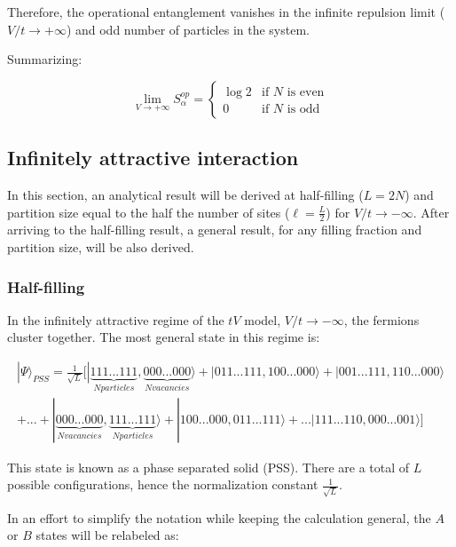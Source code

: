 \begin{samepage}
Therefore, the operational entanglement vanishes in the infinite repulsion limit ($V/t \to + \infty$) and odd number of particles in the system.

Summarizing:

\begin{equation}
\lim_{V \to + \infty} S_{\alpha}^{op} =
\begin{cases}
\log{2}  & \text{if }N\text{ is even} \\
0 & \text{if }N\text{ is odd}
\end{cases}
\end{equation}

\end{samepage}

	\subsection{Infinitely attractive interaction}
	In this section, an analytical result will be derived at half-filling ($L = 2N$) and partition size equal to the half the number of sites ($\ell = \frac{L}{2}$) for $V/t \to - \infty$. After arriving to the half-filling result, a general result, for any filling fraction and partition size, will be also derived. 
	
	\subsubsection{Half-filling}
	In the infinitely attractive regime of the $tV$ model, $V/t \to -\infty$, the fermions cluster together. The most general state in this regime is:
	
\begin{equation}
\begin{aligned}	
| \Psi \rangle_{PSS} = \frac{1}{\sqrt{L}} [ | \underbrace{111...111}_{N particles} , \underbrace{000...000}_{N vacancies} \rangle + |011...111, 100...000 \rangle + |001...111, 110...000 \rangle  \\
+ ...  + |\underbrace{000...000}_{N vacancies}, \underbrace{111...111}_{N particles} \rangle + |100...000, 011...111 \rangle + ... |111...110, 000...001 \rangle ]
\end{aligned}
\end{equation}

This state is known as a phase separated solid (PSS). There are a total of $L$ possible configurations, hence the normalization constant $\frac{1}{\sqrt{L}}$. 

In an effort to simplify the notation while keeping the calculation general, the $A$ or $B$ states will be relabeled as:

